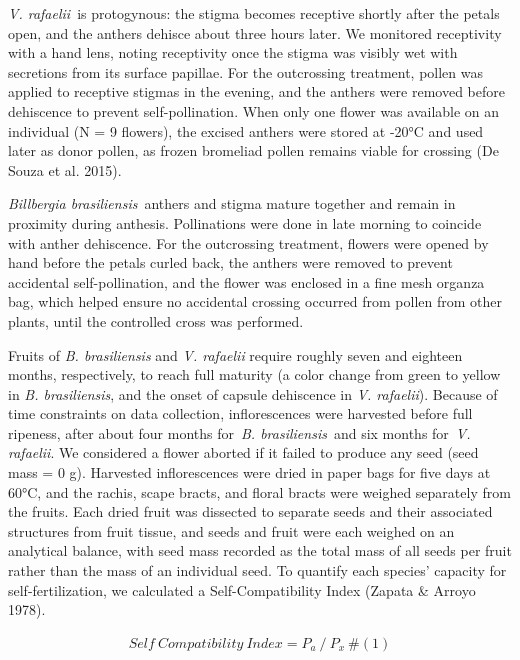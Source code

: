 \documentclass[
]{article}
\begin{document}
\emph{V. rafaelii}~is protogynous: the stigma becomes receptive shortly
after the petals open, and the anthers dehisce about three hours later.
We monitored receptivity with a hand lens, noting receptivity once the
stigma was visibly wet with secretions from its surface papillae. For
the outcrossing treatment, pollen was applied to receptive stigmas in
the evening, and the anthers were removed before dehiscence to prevent
self-pollination. When only one flower was available on an individual (N
= 9 flowers), the excised anthers were stored at -20°C and used later as
donor pollen, as frozen bromeliad pollen remains viable for crossing (De
Souza et al. 2015).

\emph{Billbergia brasiliensis}~anthers and stigma mature together and
remain in proximity during anthesis. Pollinations were done in late
morning to coincide with anther dehiscence. For the outcrossing
treatment, flowers were opened by hand before the petals curled back,
the anthers were removed to prevent accidental self-pollination, and the
flower was enclosed in a fine mesh organza bag, which helped ensure no
accidental crossing occurred from pollen from other plants, until the
controlled cross was performed.

Fruits of \emph{B. brasiliensis} and \emph{V. rafaelii} require roughly
seven and eighteen months, respectively, to reach full maturity (a color
change from green to yellow in \emph{B. brasiliensis}, and the onset of
capsule dehiscence in \emph{V. rafaelii}). Because of time constraints
on data collection, inflorescences were harvested before full ripeness,
after about four months for~\emph{B. brasiliensis}~and six months
for~\emph{V. rafaelii}. We considered a flower aborted if it failed to
produce any seed (seed mass = 0 g). Harvested inflorescences were dried
in paper bags for five days at 60°C, and the rachis, scape bracts, and
floral bracts were weighed separately from the fruits. Each dried fruit
was dissected to separate seeds and their associated structures from
fruit tissue, and seeds and fruit were each weighed on an analytical
balance, with seed mass recorded as the total mass of all seeds per
fruit rather than the mass of an individual seed. To quantify each
species' capacity for self-fertilization, we calculated a
Self-Compatibility Index (Zapata \& Arroyo 1978).

\[\begin{array}{r}
Self\ Compatibility\ Index = P_{a}\ /{\ P}_{x}\ \#(1)
\end{array}\]
\end{document}
